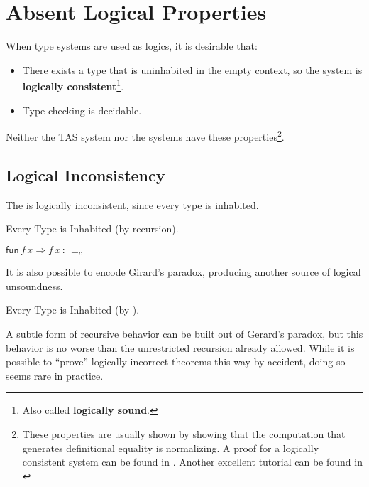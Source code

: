 \section{Absent Logical Properties}
 
When type systems are used as logics, it is desirable that:
\begin{itemize}
\item There exists a type that is uninhabited in the empty context, so the system is \textbf{logically consistent}\footnote{
  Also called \textbf{logically sound}.}.
\item Type checking is decidable.
\end{itemize}
Neither the \ac{TAS} system nor the \bidir{} systems have these properties\footnote{
 These properties are usually shown by showing that the computation that generates definitional equality is normalizing.
 A proof for a logically consistent system can be found in \cite[Chapter 4]{luo1994computation}.
 Another excellent tutorial can be found in \cite[Chapter 2]{casinghino2014combiningthesis}}.
 
\subsection{Logical Inconsistency}
 
The \slang{} is logically inconsistent, since every type is inhabited.
 
\begin{example} Every Type is Inhabited (by recursion).
 
$\mathsf{fun}\,f\,x\Rightarrow f\,x\,:\,\perp_{c}$
\end{example}
 
It is also possible to encode Girard's paradox, producing another source of logical unsoundness.
\begin{example} Every Type is Inhabited (by \tit{}).
 
 
\end{example}
 
A subtle form of recursive behavior can be built out of Gerard's paradox\cite{Reinhold89typecheckingis}, but this behavior is no worse than the unrestricted recursion already allowed.
While it is possible to ``prove'' logically incorrect theorems this way by accident, doing so seems rare in practice.
 
